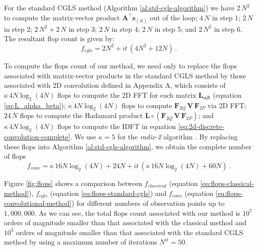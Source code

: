 \documentclass[manuscript]{geophysics}
\begin{document}
	For the standard CGLS method (Algorithm \ref{al:std-cgls-algorithm}) we have $2 \, N^2$ to compute
	the matrix-vector product $\mathbf{A}^{\top} \mathbf{s}_{(it)}$ out of the loop;
	$4 \, N$ in step 1; $2 \, N$ in step 2; $2 \, N^2 + 2 \, N$ in step 3; $2 \, N$ in step 4;
	$2 \, N$ in step 5; and $2 \, N^2$ in step 6. The resultant flop count is given by:
	\begin{equation}
		f_{cgls} =  2 N^{2} + it \, (4 N^{2} + 12 N) \: .
		\label{eq:flops-standard-cgls}
	\end{equation}
	
	
	To compute the flops count of our method, we need only to replace the flops associated with 
	matrix-vector products in the standard CGLS method by those associated with
	2D convolution defined in Appendix A, which consists of $\kappa  \, 4 N \log_2(4N)$ flops to
	compute the 2D FFT for each matrix $\mathbf{L}_{\boldsymbol{\alpha\beta}}$ (equation 
	\ref{eq:L_alpha_beta}); $\kappa  \, 4 N \log_2(4N)$ flops to compute 
	$\mathbf{F}_{2Q} \, \mathbf{V} \, \mathbf{F}_{2P}$ via 2D FFT; $24 \, N$ flops to compute the 
	Hadamard product $\mathbf{L} \circ \left(\mathbf{F}_{2Q} \, \mathbf{V} \, \mathbf{F}_{2P} \right)$; 
	and $\kappa  \, 4 N \log_2(4N)$ flops to compute the IDFT in equation 
	\ref{eq:2d-discrete-convolution-complete}. We use $\kappa = 5$ for the \emph{radix-2} algorithm
	\citep[][ p.~15]{vanloan1992}. By replacing these flops into Algorithm \ref{al:std-cgls-algorithm},
	we obtain the complete number of flops
	\begin{equation}
		f_{conv} =  \kappa  \, 16 N \log_2(4 N) + 24 N + it \, (\kappa  \, 16 N \log_2 (4 N) + 60 N) \: .
		\label{eq:flops-convolutional-method}
	\end{equation}
	
	Figure \ref{fig:flops} shows a comparison between 
	$f_{classical}$ (equation \ref{eq:flops-classical-method}), 
	$f_{cgls}$ (equation \ref{eq:flops-standard-cgls}) and 
	$f_{conv}$ (equation \ref{eq:flops-convolutional-method})
	for different numbers of observation points up to $1,000,000$. As we can see, 
	the total flops count associated with our method is $10^7$ orders of magnitude smaller 
	than that associated with the classical method and $10^3$ orders of magnitude smaller than
	that associated with the standard CGLS method by using a maximum number
	of iterations $N^{it} = 50$. 
	
\end{document}

